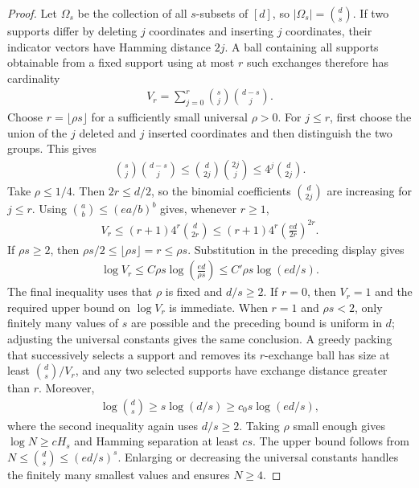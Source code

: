 \documentclass[letterpaper,12pt]{article}
\numberwithin{equation}{section}
\theoremstyle{plain}
\numberwithin{Theorem}{section}
\numberwithin{proposition}{section}
\numberwithin{Lemma}{section}
{
	\theoremstyle{definition}
	\newtheorem{Definition}{Definition}
	\newtheorem{example}{Example}
	\numberwithin{example}{section}
	\newtheorem{fact}{Fact}
	\numberwithin{fact}{section}
	\newtheorem{remark}{Remark}
}
\newcommand{\1}{\mathbbm{1}}
\begin{document}
\begin{proof}
Let $\Omega_s$ be the collection of all $s$-subsets of $[d]$, so
$|\Omega_s|=\binom ds$.  If two supports differ by deleting $j$
coordinates and inserting $j$ coordinates, their indicator vectors
have Hamming distance $2j$.  A ball containing all supports obtainable
from a fixed support using at most $r$ such exchanges therefore has
cardinality
\begin{align*}
    V_r=\sum_{j=0}^r\binom sj\binom{d-s}{j}.
\end{align*}
Choose $r=\lfloor\rho s\rfloor$ for a sufficiently small universal
$\rho>0$.  For $j\leq r$, first choose the union of the $j$ deleted
and $j$ inserted coordinates and then distinguish the two groups.  This
gives
\begin{align*}
    \binom sj\binom{d-s}{j}
    \leq\binom d{2j}\binom{2j}j
    \leq4^j\binom d{2j}.
\end{align*}
Take $\rho\leq1/4$.  Then $2r\leq d/2$, so the binomial coefficients
$\binom d{2j}$ are increasing for $j\leq r$.  Using
$\binom ab\leq(ea/b)^b$ gives, whenever $r\geq1$,
\begin{align*}
    V_r
    \leq(r+1)4^r\binom d{2r}
    \leq(r+1)4^r\left(\frac{ed}{2r}\right)^{2r}.
\end{align*}
If $\rho s\geq2$, then
$\rho s/2\leq\lfloor\rho s\rfloor=r\leq\rho s$.  Substitution in the
preceding display gives
\begin{align*}
    \log V_r
    \leq C\rho s\log\!\left(\frac{ed}{\rho s}\right)
    \leq C'\rho s\log(ed/s).
\end{align*}
	The final inequality uses that $\rho$ is fixed and $d/s\geq2$.  If
	$r=0$, then $V_r=1$ and the required upper bound on $\log V_r$ is
	immediate. When $r=1$ and $\rho s<2$, only finitely many values of
	$s$ are possible and the preceding bound is uniform in $d$;
	adjusting the universal constants gives the same conclusion.
A greedy packing that successively selects a support and removes its
$r$-exchange ball has size at least $\binom ds/V_r$, and any two
selected supports have exchange distance greater than $r$.
Moreover,
\begin{align*}
    \log\binom ds\geq s\log(d/s)\geq c_0s\log(ed/s),
\end{align*}
where the second inequality again uses $d/s\geq2$.  Taking $\rho$
small enough gives $\log N\geq cH_s$ and Hamming separation at least
$cs$.  The upper bound follows from
$N\leq\binom ds\leq(ed/s)^s$.  Enlarging or decreasing the universal
constants handles the finitely many smallest values and ensures
$N\geq4$.
\end{proof}
\end{document}
